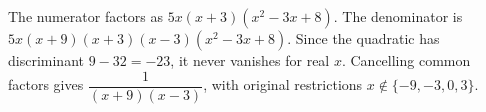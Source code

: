 The numerator factors as $5x(x+3)(x^2-3x+8)$. The denominator is $5x(x+9)(x+3)(x-3)(x^2-3x+8)$. Since the quadratic has discriminant $9-32=-23$, it never vanishes for real $x$. Cancelling common factors gives $\boxed{\dfrac{1}{(x+9)(x-3)}}$, with original restrictions $x\notin\{-9,-3,0,3\}$.
